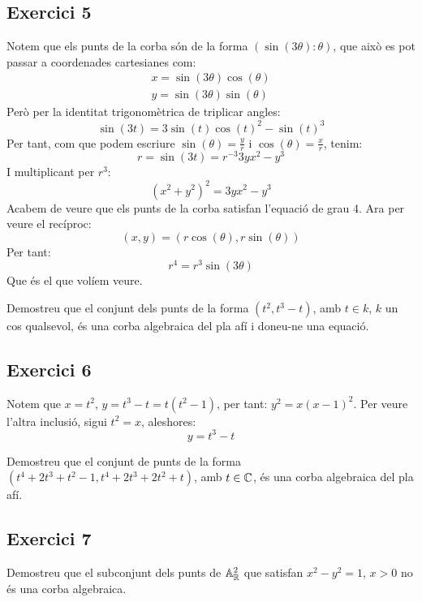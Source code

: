 \documentclass[11pt, a4paper]{article}
\begin{document}
\subsection{Exercici 5}
Notem que els punts de la corba són de la forma $(\sin(3\theta):\theta)$, que això es pot passar a coordenades cartesianes com:
\[
\begin{array}{ll}
    x = \sin(3\theta)\cos(\theta)\\
    y = \sin(3\theta)\sin(\theta)
\end{array}
\]
Però per la identitat trigonomètrica de triplicar angles:
\[
    \sin(3t) = 3\sin(t)\cos(t)^2-\sin(t)^3
\]
Per tant, com que podem escriure $\sin(\theta) = \frac{y}{r}$ i $\cos (\theta) = \frac{x}{r}$, tenim:
\[
    r = \sin(3t) =r^{-3} 3yx^2-y^3
\]
I multiplicant per $r^3$:
\[
    (x^2+y^2)^2 = 3yx^2-y^3
\]
Acabem de veure que els punts de la corba satisfan l'equació de grau 4. Ara per veure el recíproc:
\[
    (x,y)=(r\cos(\theta),r\sin(\theta))
\]
Per tant:
\[
    r^4 = r^{3}\sin(3\theta)
\]
Que és el que volíem veure.
\newpage
\begin{tcolorbox}[title=\section{Exercici 6}]
Demostreu que el conjunt dels punts de la forma $(t^2, t^3 - t)$, amb $t \in k$, $k$ un cos qualsevol, és una corba algebraica del pla afí i doneu-ne una equació.
\end{tcolorbox}
\subsection{Exercici 6}
Notem que $x=t^2$, $y=t^3-t=t(t^2-1)$, per tant: $y^2=x(x-1)^2$.
Per veure l'altra inclusió, sigui $t^2=x$, aleshores:
\[
    y=t^3-t
\]
\newpage
\begin{tcolorbox}[title=\section{Exercici 7}]
Demostreu que el conjunt de punts de la forma $(t^4 + 2t^3 + t^2 - 1,t^4 + 2t^3 + 2t^2 + t)$, amb $t \in \mathbb C$, és una corba algebraica del pla afí.
\end{tcolorbox}
\subsection{Exercici 7}
\newpage
\begin{tcolorbox}[title=\section{Exercici 8}]
Demostreu que el subconjunt dels punts de $\mathbb A^2_\mathbb R$ que satisfan $x^2 - y^2 = 1$, $x > 0$ no és una corba algebraica.
\end{tcolorbox}
\end{document}
